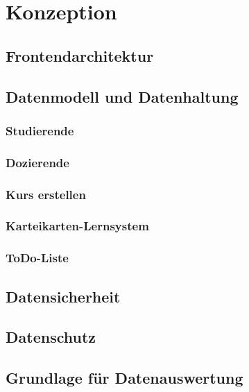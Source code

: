 \chapter{Konzeption}
\section{Frontendarchitektur}
\section{Datenmodell und Datenhaltung}
\subsection{Studierende}
\subsection{Dozierende}
\subsection{Kurs erstellen}
\subsection{Karteikarten-Lernsystem}
\subsection{ToDo-Liste}
\section{Datensicherheit}
\section{Datenschutz}
\section{Grundlage für Datenauswertung}

